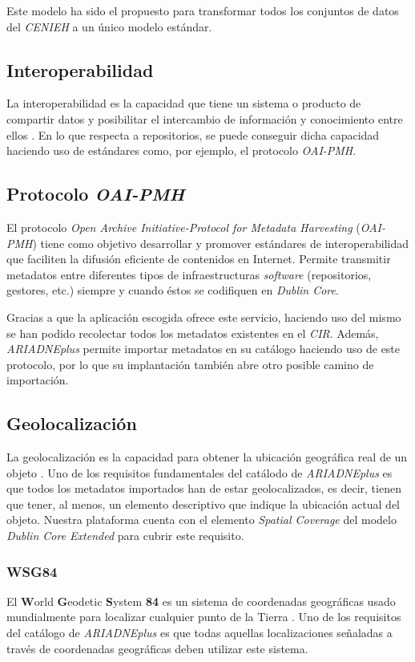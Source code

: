 Este modelo ha sido el propuesto para transformar todos los conjuntos de 
datos del \emph{CENIEH} a un único modelo estándar.

\subsection{Interoperabilidad}

La interoperabilidad es la capacidad que tiene un sistema o producto de
compartir datos y posibilitar el intercambio de información y
conocimiento entre ellos \cite{book:iso_iso}.
En lo que respecta a repositorios, se puede conseguir dicha capacidad
haciendo uso de estándares como, por ejemplo, el protocolo
\emph{OAI-PMH}.

\subsection{Protocolo \emph{OAI-PMH}}

El protocolo \emph{Open Archive Initiative-Protocol for Metadata
Harvesting} (\emph{OAI-PMH}) tiene como objetivo desarrollar y promover
estándares de interoperabilidad que faciliten la difusión eficiente de
contenidos en Internet. Permite transmitir metadatos entre diferentes
tipos de infraestructuras \emph{software} (repositorios, gestores, etc.)
siempre y cuando éstos se codifiquen en \emph{Dublin Core}.

Gracias a que la aplicación escogida ofrece este servicio, haciendo uso
del mismo se han podido recolectar todos los metadatos existentes en el
\emph{CIR}. Además, \emph{ARIADNEplus} permite importar metadatos en su catálogo
haciendo uso de este protocolo, por lo que su implantación también abre
otro posible camino de importación.


\subsection{Geolocalización}

La geolocalización es la capacidad para obtener la ubicación geográfica
real de un objeto \cite{wiki:geo}. Uno de
los requisitos fundamentales del catálodo de \emph{ARIADNEplus} es que todos
los metadatos importados han de estar geolocalizados, es decir, tienen
que tener, al menos, un elemento descriptivo que indique la ubicación
actual del objeto. Nuestra plataforma cuenta con el elemento
\emph{Spatial Coverage} del modelo \emph{Dublin Core Extended} para
cubrir este requisito.

\subsubsection{WSG84}

El \textbf{W}orld \textbf{G}eodetic \textbf{S}ystem \textbf{84} es un
sistema de coordenadas geográficas usado mundialmente para localizar
cualquier punto de la Tierra \cite{wiki:wsg}. Uno de los requisitos del catálogo de
\emph{ARIADNEplus} es que todas aquellas localizaciones señaladas a través de
coordenadas geográficas deben utilizar este sistema.

